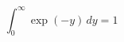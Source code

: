 \documentclass[preview]{standalone}
\begin{document}
$$\int_0^\infty \exp(-y)\,dy=1$$
\end{document}
